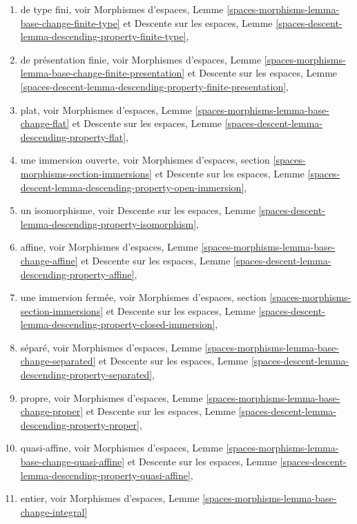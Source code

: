 \begin{enumerate}
Morphismes d'espaces,
Lemme \ref{spaces-morphisms-lemma-base-change-finite-presentation}
et
Descente sur les espaces, Lemme
\ref{spaces-descent-lemma-descending-property-locally-finite-presentation},
\item de type fini, voir
Morphismes d'espaces,
Lemme \ref{spaces-morphisms-lemma-base-change-finite-type}
et
Descente sur les espaces,
Lemme \ref{spaces-descent-lemma-descending-property-finite-type},
\item de présentation finie, voir
Morphismes d'espaces,
Lemme \ref{spaces-morphisms-lemma-base-change-finite-presentation}
et
Descente sur les espaces, Lemme
\ref{spaces-descent-lemma-descending-property-finite-presentation},
\item plat, voir
Morphismes d'espaces,
Lemme \ref{spaces-morphisms-lemma-base-change-flat}
et
Descente sur les espaces,
Lemme \ref{spaces-descent-lemma-descending-property-flat},
\item une immersion ouverte, voir
Morphismes d'espaces,
section \ref{spaces-morphisms-section-immersions}
et
Descente sur les espaces,
Lemme \ref{spaces-descent-lemma-descending-property-open-immersion},
\item un isomorphisme, voir
Descente sur les espaces,
Lemme \ref{spaces-descent-lemma-descending-property-isomorphism},
\item affine, voir
Morphismes d'espaces,
Lemme \ref{spaces-morphisms-lemma-base-change-affine}
et
Descente sur les espaces,
Lemme \ref{spaces-descent-lemma-descending-property-affine},
\item une immersion fermée, voir
Morphismes d'espaces, section \ref{spaces-morphisms-section-immersions}
et
Descente sur les espaces,
Lemme \ref{spaces-descent-lemma-descending-property-closed-immersion},
\item séparé, voir
Morphismes d'espaces,
Lemme \ref{spaces-morphisms-lemma-base-change-separated}
et
Descente sur les espaces,
Lemme \ref{spaces-descent-lemma-descending-property-separated},
\item propre, voir
Morphismes d'espaces,
Lemme \ref{spaces-morphisms-lemma-base-change-proper}
et
Descente sur les espaces,
Lemme \ref{spaces-descent-lemma-descending-property-proper},
\item quasi-affine, voir
Morphismes d'espaces,
Lemme \ref{spaces-morphisms-lemma-base-change-quasi-affine}
et
Descente sur les espaces,
Lemme \ref{spaces-descent-lemma-descending-property-quasi-affine},
\item entier, voir
Morphismes d'espaces,
Lemme \ref{spaces-morphisms-lemma-base-change-integral}

\end{enumerate}
